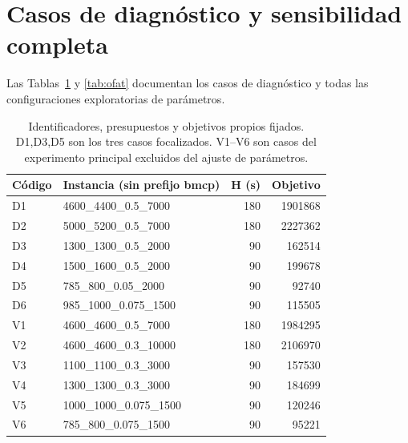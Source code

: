 \section{Casos de diagnóstico y sensibilidad completa}
\label{app:diagnostics}
Las Tablas~\ref{tab:diagnostic-cases} y \ref{tab:ofat} documentan los casos de diagnóstico y todas las configuraciones exploratorias de parámetros.
\begin{table}[H]
\centering\small
\caption{Identificadores, presupuestos y objetivos propios fijados. D1,D3,D5 son los tres casos focalizados. V1--V6 son casos del experimento principal excluidos del ajuste de parámetros.}
\label{tab:diagnostic-cases}
\begin{tabular}{llrr}
\toprule
Código & Instancia (sin prefijo bmcp) & H (s) & Objetivo\\
\midrule
D1 & 4600\_4400\_0.5\_7000 & 180 & 1901868\\
D2 & 5000\_5200\_0.5\_7000 & 180 & 2227362\\
D3 & 1300\_1300\_0.5\_2000 & 90 & 162514\\
D4 & 1500\_1600\_0.5\_2000 & 90 & 199678\\
D5 & 785\_800\_0.05\_2000 & 90 & 92740\\
D6 & 985\_1000\_0.075\_1500 & 90 & 115505\\
V1 & 4600\_4600\_0.5\_7000 & 180 & 1984295\\
V2 & 4600\_4600\_0.3\_10000 & 180 & 2106970\\
V3 & 1100\_1100\_0.3\_3000 & 90 & 157530\\
V4 & 1300\_1300\_0.3\_3000 & 90 & 184699\\
V5 & 1000\_1000\_0.075\_1500 & 90 & 120246\\
V6 & 785\_800\_0.075\_1500 & 90 & 95221\\
\bottomrule
\end{tabular}
\end{table}

